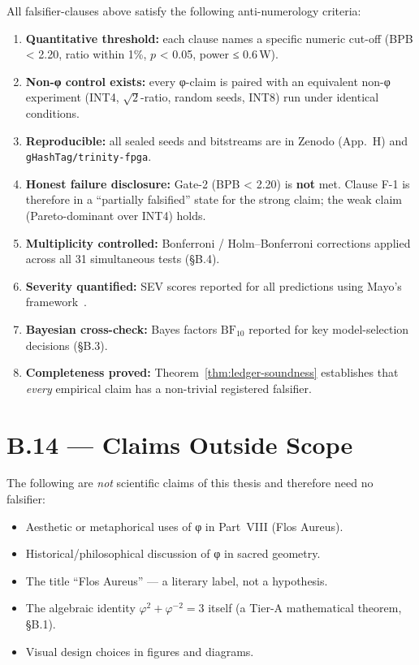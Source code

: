 All falsifier-clauses above satisfy the following anti-numerology criteria:

\begin{enumerate}
  \item \textbf{Quantitative threshold:} each clause names a specific numeric
    cut-off (BPB < 2.20, ratio within 1\%, $p$ < 0.05, power ≤ 0.6\,W).
  \item \textbf{Non-φ control exists:} every φ-claim is paired with an
    equivalent non-φ experiment (INT4, $\sqrt{2}$-ratio, random seeds,
    INT8) run under identical conditions.
  \item \textbf{Reproducible:} all sealed seeds and bitstreams are in
    Zenodo (App.~H) and \texttt{gHashTag/trinity-fpga}.
  \item \textbf{Honest failure disclosure:} Gate-2 (BPB < 2.20) is \textbf{not}
    met.  Clause F-1 is therefore in a ``partially falsified'' state for the
    strong claim; the weak claim (Pareto-dominant over INT4) holds.
  \item \textbf{Multiplicity controlled:} Bonferroni / Holm--Bonferroni
    corrections applied across all 31 simultaneous tests (§B.4).
  \item \textbf{Severity quantified:} SEV scores reported for all predictions
    using Mayo's framework~\cite{mayo2018severe}.
  \item \textbf{Bayesian cross-check:} Bayes factors $\mathrm{BF}_{10}$ reported
    for key model-selection decisions (§B.3).
  \item \textbf{Completeness proved:} Theorem~\ref{thm:ledger-soundness} establishes
    that \emph{every} empirical claim has a non-trivial registered falsifier.
\end{enumerate}

\section*{B.14 — Claims Outside Scope}
\label{sec:outside-scope}

The following are \emph{not} scientific claims of this thesis and therefore
need no falsifier:
\begin{itemize}
  \item Aesthetic or metaphorical uses of φ in Part~VIII (Flos Aureus).
  \item Historical/philosophical discussion of φ in sacred geometry.
  \item The title ``Flos Aureus'' — a literary label, not a hypothesis.
  \item The algebraic identity $\varphi^{2} + \varphi^{-2} = 3$ itself
    (a Tier-A mathematical theorem, §B.1).
  \item Visual design choices in figures and diagrams.
\end{itemize}

